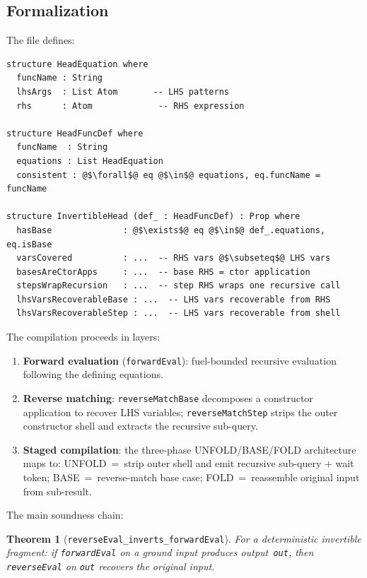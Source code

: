 \documentclass[11pt]{article}
\newtheorem{theorem}{Theorem}[section]
\theoremstyle{definition}
\theoremstyle{remark}
\begin{document}
\subsection{Formalization}

The file defines:

\begin{lstlisting}[caption={Core definitions (\texttt{InvertibleHead.lean}).}]
structure HeadEquation where
  funcName : String
  lhsArgs  : List Atom       -- LHS patterns
  rhs      : Atom             -- RHS expression

structure HeadFuncDef where
  funcName  : String
  equations : List HeadEquation
  consistent : @$\forall$@ eq @$\in$@ equations, eq.funcName = funcName

structure InvertibleHead (def_ : HeadFuncDef) : Prop where
  hasBase              : @$\exists$@ eq @$\in$@ def_.equations, eq.isBase
  varsCovered          : ...  -- RHS vars @$\subseteq$@ LHS vars
  basesAreCtorApps     : ...  -- base RHS = ctor application
  stepsWrapRecursion   : ...  -- step RHS wraps one recursive call
  lhsVarsRecoverableBase : ...  -- LHS vars recoverable from RHS
  lhsVarsRecoverableStep : ...  -- LHS vars recoverable from shell
\end{lstlisting}

\noindent
The compilation proceeds in layers:

\begin{enumerate}[nosep]
  \item \textbf{Forward evaluation} (\texttt{forwardEval}): fuel-bounded
        recursive evaluation following the defining equations.
  \item \textbf{Reverse matching}: \texttt{reverseMatchBase} decomposes a
        constructor application to recover LHS variables;
        \texttt{reverseMatchStep} strips the outer constructor shell and
        extracts the recursive sub-query.
  \item \textbf{Staged compilation}: the three-phase UNFOLD/BASE/FOLD
        architecture maps to: UNFOLD~=~strip outer shell and emit
        recursive sub-query + wait token; BASE~=~reverse-match base case;
        FOLD~=~reassemble original input from sub-result.
\end{enumerate}

The main soundness chain:

\begin{theorem}[\texttt{reverseEval\_inverts\_forwardEval}]
For a deterministic invertible fragment: if \texttt{forwardEval} on a
ground input produces output~\texttt{out}, then \texttt{reverseEval} on
\texttt{out} recovers the original input.
\end{theorem}
\end{document}
